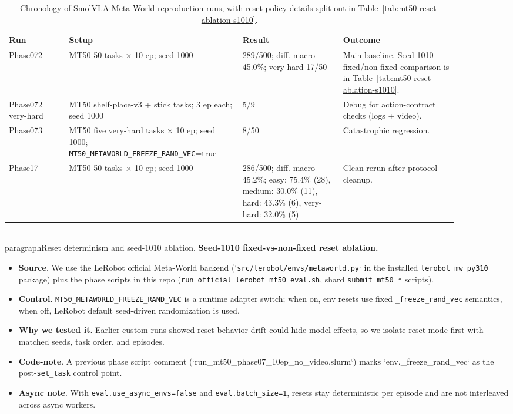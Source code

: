 \documentclass{article}
\begin{document}
\begin{table}[H]
  \centering
  \small
  \begin{tabular}{p{0.12\linewidth}p{0.34\linewidth}p{0.20\linewidth}p{0.23\linewidth}}
    \toprule
    Run & Setup & Result & Outcome \\
    \midrule
    Phase072 & MT50 50 tasks $\times$ 10 ep; seed 1000 & 289/500; diff.-macro 45.0\%; very-hard 17/50 & Main baseline. Seed-1010 fixed/non-fixed comparison is in Table~\ref{tab:mt50-reset-ablation-s1010}. \\
    Phase072 very-hard & MT50 shelf-place-v3 + stick tasks; 3 ep each; seed 1000 & 5/9 & Debug for action-contract checks (logs + video). \\
    Phase073 & MT50 five very-hard tasks $\times$ 10 ep; seed 1000; \texttt{MT50\_METAWORLD\_FREEZE\_RAND\_VEC}=true & 8/50 & Catastrophic regression. \\
    Phase17 & MT50 50 tasks $\times$ 10 ep; seed 1000 & 286/500; diff.-macro 45.2\%; easy: 75.4\% (28), medium: 30.0\% (11), hard: 43.3\% (6), very-hard: 32.0\% (5) & Clean rerun after protocol cleanup. \\
    \bottomrule
  \end{tabular}
  \caption{Chronology of SmolVLA Meta-World reproduction runs, with reset policy details split out in Table~\ref{tab:mt50-reset-ablation-s1010}.}
  \label{tab:mt50-eval-ledger}
\end{table}

\\paragraph{Reset determinism and seed-1010 ablation.}
\textbf{Seed-1010 fixed-vs-non-fixed reset ablation.}
\begin{itemize}
  \item \textbf{Source}. We use the LeRobot official Meta-World backend (`\texttt{src/lerobot/envs/metaworld.py}` in the installed \texttt{lerobot\_mw\_py310} package) plus the phase scripts in this repo (\texttt{run\_official\_lerobot\_mt50\_eval.sh}, shard \texttt{submit\_mt50\_*} scripts).
  \item \textbf{Control}. \texttt{MT50\_METAWORLD\_FREEZE\_RAND\_VEC} is a runtime adapter switch; when on, env resets use fixed \texttt{\_freeze\_rand\_vec} semantics, when off, LeRobot default seed-driven randomization is used.
  \item \textbf{Why we tested it}. Earlier custom runs showed reset behavior drift could hide model effects, so we isolate reset mode first with matched seeds, task order, and episodes.
  \item \textbf{Code-note}. A previous phase script comment (`run\_mt50\_phase07\_10ep\_no\_video.slurm`) marks `env.\_freeze\_rand\_vec` as the post-\texttt{set\_task} control point.
  \item \textbf{Async note}. With \texttt{eval.use\_async\_envs=false} and \texttt{eval.batch\_size=1}, resets stay deterministic per episode and are not interleaved across async workers.
\end{itemize}
\end{document}
